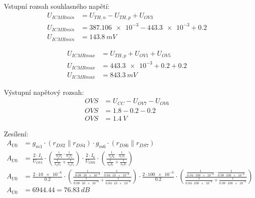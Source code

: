     Vstupní rozsah souhlasného napětí:
    \begin{align*}
        U_{ICMRmin} &= U_{TH,n}-U_{TH,p} +U_{OV3} \\ 
        U_{ICMRmin} &= \num{387.106e-3}-\num{443.3e-3} +\num{0.2} \\ 
        U_{ICMRmin} &= \qty{143,8}{mV}
    \end{align*}

    \begin{align*}
        U_{ICMRmax} &= U_{TH,p} + U_{OV1} + U_{OV5}  \\ 
        U_{ICMRmax} &= \num{443.3e-3} +\num{0.2}+\num{0.2} \\ 
        U_{ICMRmax} &= \qty{843.3}{mV}
    \end{align*}

    Výstupní napětový rozsah:
    \begin{align*}
        OVS &= U_{CC} -U_{OV7} -U_{OV6} \\ 
        OVS &= \num{1.8} -\num{0.2} -\num{0.2} \\
        OVS &= \qty{1.4}{V}
    \end{align*}

    Zesílení:
    \begin{align*}
    A_{U0} &= g_{m 1} \cdot\left(r_{D S 2} \| r_{D S 4}\right) \cdot g_{m 6} \cdot\left(r_{D S 6} \| r_{D S 7}\right) \\
    A_{U0} &= \frac{2\cdot I_{1}}{U_{OV1}} 
        \cdot\left(\frac{\frac{1}{\lambda_2 I_2} \cdot \frac{1}{\lambda_4 I_4}}{\frac{1}{\lambda_2 I_2}+\frac{1}{\lambda_4 I_4}}\right) \cdot \frac{2\cdot I_{6} }{U_{OV6} } 
        \cdot\left(\frac{\frac{1}{\lambda_6 I_6} \cdot \frac{1}{\lambda_7 I_7}}{\frac{1}{\lambda_6 I_6}+\frac{1}{\lambda_7 I_7}}\right) \\
    A_{U0} &= \frac{2\cdot \num{10e-6}}{\num{0.2}} 
        \cdot\left(\frac{\frac{1}{\num{0.08}\cdot  \num{10e-6}} \cdot \frac{1}{\num{0.04}\cdot  \num{10e-6}}}{\frac{1}{\num{0.08}\cdot  \num{10e-6}}+\frac{1}{\num{0.04}\cdot  \num{10e-6}}}\right) \cdot \frac{2\cdot \num{100e-6} }{\num{0.2} } 
        \cdot\left(\frac{\frac{1}{\num{0.04}\cdot  \num{100e-6}} \cdot \frac{1}{\num{0.08}\cdot  \num{100e-6}}}{\frac{1}{\num{0.04} \cdot \num{100e-6}}+\frac{1}{\num{0.08}\cdot  \num{100e-6}}}\right) \\
        A_{U0} &= \num{6944.44} = \qty{76.83}{dB}
    \end{align*}





